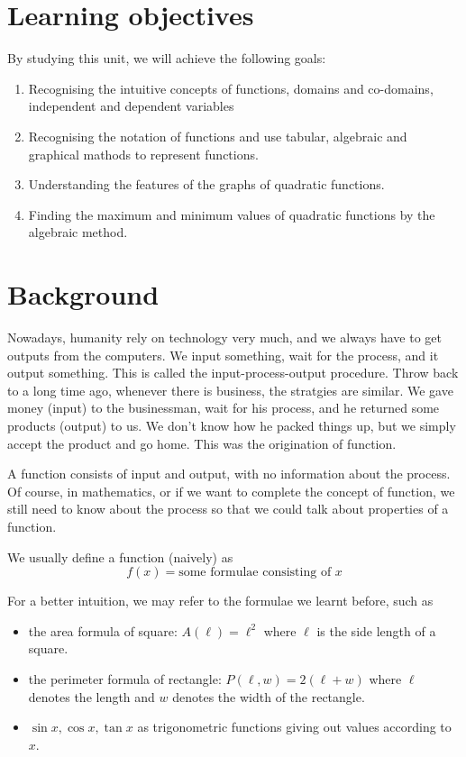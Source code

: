 \documentclass[12pt]{article}
\begin{document}
    \section*{Learning objectives}
    By studying this unit, we will achieve the following goals:
    \begin{enumerate}
        \item Recognising the intuitive concepts of functions, domains and co-domains, independent and dependent variables
        \item Recognising the notation of functions and use tabular, algebraic and graphical mathods to represent functions.
        \item Understanding the features of the graphs of quadratic functions.
        \item Finding the maximum and minimum values of quadratic functions by the algebraic method.
    \end{enumerate}

    \section*{Background}
    Nowadays, humanity rely on technology very much, and we always have to get outputs from the computers. We input something, wait for the process, and it output something. This  is called the input-process-output procedure. Throw back to a long time ago, whenever there is business, the stratgies are similar. We gave money (input) to the businessman, wait for his process, and he returned some products (output) to us. We don't know how he packed things up, but we simply accept the product and go home. This was the origination of function.

    A function consists of input and output, with no information about the process. Of course, in mathematics, or if we want to complete the concept of function, we still need to know about the process so that we could talk about properties of a function.

    We usually define a function (naively) as $$f(x)=\textrm{some formulae consisting of }x$$

    For a better intuition, we may refer to the formulae we learnt before, such as 
    \begin{itemize}
        \item the area formula of square: $A(\ell)=\ell^2$ where $\ell$ is the side length of a square.
        \item the perimeter formula of rectangle: $P(\ell,w)=2(\ell+w)$ where $\ell$ denotes the length and $w$ denotes the width of the rectangle.
        \item $\sin{x},\cos{x},\tan{x}$ as trigonometric functions giving out values according to $x$.
    \end{itemize}
\end{document}
